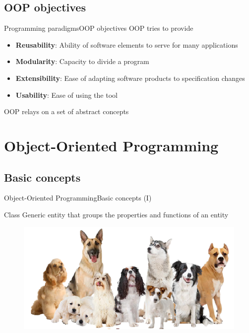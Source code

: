 \documentclass[10pt,compress]{beamer} %
\begin{document}
\subsection{OOP objectives}

\begin{frame}{Programming paradigms}{OOP objectives}
OOP tries to provide
\begin{itemize}
  	\item \textbf{Reusability}: Ability of software elements to serve for many applications
	\item \textbf{Modularity}: Capacity to divide a program
  	\item \textbf{Extensibility}: Ease of adapting software products to specification changes
  	\item \textbf{Usability}: Ease of using the tool
\end{itemize} 	
OOP relays on a set of abstract concepts
\end{frame}


\section[Object-Oriented Programming]{Object-Oriented Programming}

\subsection{Basic concepts}

\begin{frame}{Object-Oriented Programming}{Basic concepts (I)}
	\begin{block}{Class}
		 Generic entity that groups the properties and functions of an entity
  	\end{block}	
		\begin{figure}
			\includegraphics[scale=0.5]{figs/clase}	
		\end{figure}				
\end{frame}
\end{document}
